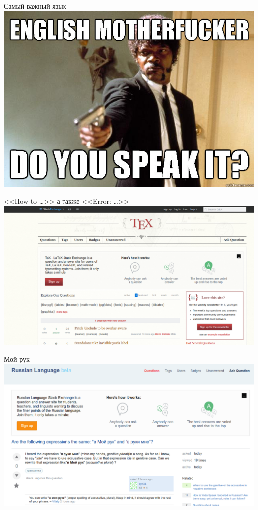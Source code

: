 \documentclass[newPxFont]{beamer}
\begin{document}
\begin{frame}{Самый важный язык}
\centering \includegraphics[width=\linewidth]{english.jpg}\\
\end{frame}


\begin{frame}{<<How to \ldots>> а также <<Error: \ldots>>}
\centering \includegraphics[width=\linewidth]{texexchan.png}\\
\end{frame}


\begin{frame}{Мой рук}
\centering \includegraphics[width=\linewidth]{russia.png}\\
\end{frame}
\end{document}
